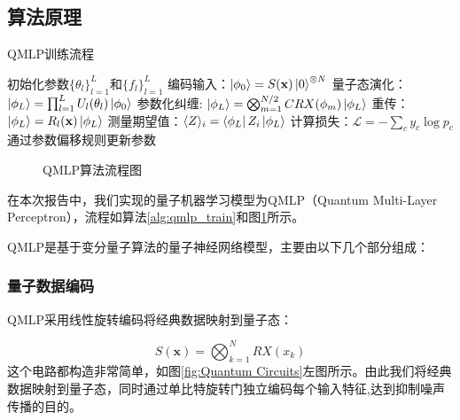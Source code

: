 \documentclass[10pt,a4paper,twoside]{article}
\numberwithin{figure}{section}%
\numberwithin{table}{section}%
\begin{document}
\subsection{算法原理}

\begin{algorithm}[H]
    \caption{QMLP训练流程}
    \label{alg:qmlp_train}
    \begin{algorithmic}[1]
    \State 初始化参数$\{\theta_l\}_{l=1}^L$和$\{f_l\}_{l=1}^L$
        \State 编码输入：$\ket{\phi_0} = S(\mathbf{x})\ket{0}^{\otimes N}$
        \State 量子态演化：$\ket{\phi_L} = \prod_{l=1}^L U_l(\theta_l)\ket{\phi_0}$
        \State 参数化纠缠: $\ket{\phi_L} = \bigotimes_{m=1}^{N/2} CRX(\phi_m)\ket{\phi_L}$
        \State 重传：$\ket{\phi_L} = R_l(\mathbf{x})\ket{\phi_L}$
        \State 测量期望值：$\langle Z\rangle_i = \bra{\phi_L} Z_i \ket{\phi_L}$
        \State 计算损失：$\mathcal{L} = -\sum_c y_c \log p_c$
        \State 通过参数偏移规则更新参数
    \EndFor
    \end{algorithmic}
\end{algorithm}

\begin{figure}[htbp]
    \centering
    \caption{QMLP算法流程图}
    \label{fig:qmlp_flow_smart}
\end{figure}
在本次报告中，我们实现的量子机器学习模型为QMLP（Quantum Multi-Layer Perceptron），流程如算法\ref{alg:qmlp_train}和图\ref{fig:qmlp_flow_smart}所示。

QMLP是基于变分量子算法的量子神经网络模型，主要由以下几个部分组成：
\subsubsection{量子数据编码}

QMLP采用线性旋转编码将经典数据映射到量子态：

\begin{equation}
S(\mathbf{x}) = \bigotimes_{k=1}^N RX(x_k)
    \label{eq:linear_encoding}
\end{equation}
这个电路都构造非常简单，如图\ref{fig:Quantum Circuits}左图所示。由此我们将经典数据映射到量子态，同时通过单比特旋转门独立编码每个输入特征,达到抑制噪声传播的目的。
\end{document}
